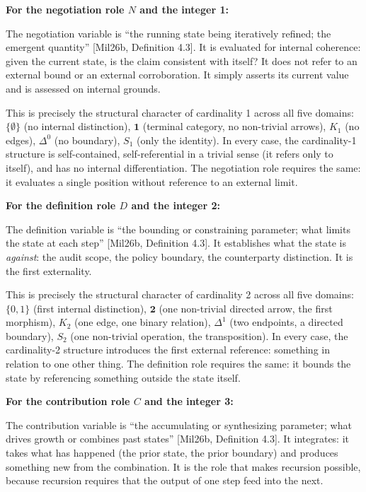 \documentclass[
  11pt,
  letterpaper,
]{article}
\begin{document}
\textbf{For the negotiation role \(N\) and the integer 1:}

The negotiation variable is ``the running state being iteratively
refined; the emergent quantity'' {[}Mil26b, Definition 4.3{]}. It is
evaluated for internal coherence: given the current state, is the claim
consistent with itself? It does not refer to an external bound or an
external corroboration. It simply asserts its current value and is
assessed on internal grounds.

This is precisely the structural character of cardinality 1 across all
five domains: \(\{\emptyset\}\) (no internal distinction),
\(\mathbf{1}\) (terminal category, no non-trivial arrows), \(K_1\) (no
edges), \(\Delta^0\) (no boundary), \(S_1\) (only the identity). In
every case, the cardinality-1 structure is self-contained,
self-referential in a trivial sense (it refers only to itself), and has
no internal differentiation. The negotiation role requires the same: it
evaluates a single position without reference to an external limit.

\textbf{For the definition role \(D\) and the integer 2:}

The definition variable is ``the bounding or constraining parameter;
what limits the state at each step'' {[}Mil26b, Definition 4.3{]}. It
establishes what the state is \emph{against}: the audit scope, the
policy boundary, the counterparty distinction. It is the first
externality.

This is precisely the structural character of cardinality 2 across all
five domains: \(\{0,1\}\) (first internal distinction), \(\mathbf{2}\)
(one non-trivial directed arrow, the first morphism), \(K_2\) (one edge,
one binary relation), \(\Delta^1\) (two endpoints, a directed boundary),
\(S_2\) (one non-trivial operation, the transposition). In every case,
the cardinality-2 structure introduces the first external reference:
something in relation to one other thing. The definition role requires
the same: it bounds the state by referencing something outside the state
itself.

\textbf{For the contribution role \(C\) and the integer 3:}

The contribution variable is ``the accumulating or synthesizing
parameter; what drives growth or combines past states'' {[}Mil26b,
Definition 4.3{]}. It integrates: it takes what has happened (the prior
state, the prior boundary) and produces something new from the
combination. It is the role that makes recursion possible, because
recursion requires that the output of one step feed into the next.
\end{document}
